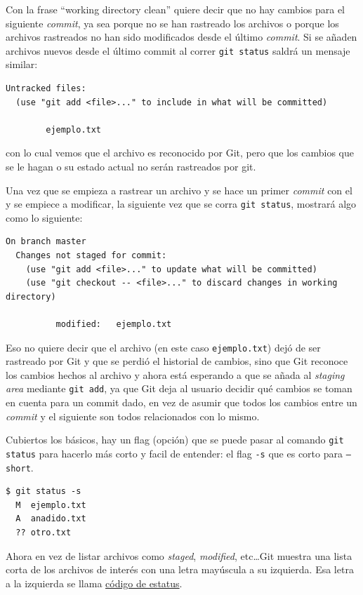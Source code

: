 \documentclass[spanish, 12pt, a4paper]{article}
\begin{document}
Con la frase ``working directory clean'' quiere decir que no hay cambios para el siguiente \textit{commit}, ya sea porque no se han rastreado los archivos o porque los archivos rastreados no han sido modificados desde el último \textit{commit}.
Si se añaden archivos nuevos desde el último commit al correr \texttt{git status} saldrá un mensaje similar:
\begin{lstlisting}
Untracked files:
  (use "git add <file>..." to include in what will be committed)

        ejemplo.txt
\end{lstlisting}
con lo cual vemos que el archivo es reconocido por Git, pero que los cambios que se le hagan o su estado actual no serán rastreados por git.

Una vez que se empieza a rastrear un archivo y se hace un primer \textit{commit} con el y se empiece a modificar, la siguiente vez que se corra \texttt{git status}, mostrará algo como lo siguiente: 
\begin{lstlisting}
On branch master
  Changes not staged for commit:
    (use "git add <file>..." to update what will be committed)
    (use "git checkout -- <file>..." to discard changes in working directory)
  
          modified:   ejemplo.txt
\end{lstlisting} 
Eso no quiere decir que el archivo (en este caso \texttt{ejemplo.txt}) dejó de ser rastreado por Git y que se perdió el historial de cambios, sino que Git reconoce los cambios hechos al archivo y ahora está esperando a que se añada al \textit{staging area} mediante \texttt{git add}, ya que Git deja al usuario decidir qué cambios se toman en cuenta para un commit dado, en vez de asumir que todos los cambios entre un \textit{commit} y el siguiente son todos relacionados con lo mismo.

Cubiertos los básicos, hay un flag (opción) que se puede pasar al comando \texttt{git status} para hacerlo más corto y facil de entender: el flag \texttt{-s} que es corto para \texttt{--short}.
\begin{lstlisting}
$ git status -s
  M  ejemplo.txt
  A  anadido.txt
  ?? otro.txt
\end{lstlisting}

Ahora en vez de listar archivos como \textit{staged}, \textit{modified}, etc\dots Git muestra una lista corta de los archivos de interés con una letra mayúscula a su izquierda.
Esa letra a la izquierda se llama \underline{código de estatus}.
\end{document}
